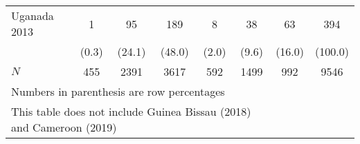 \begin{tabular}{l*{7}{c}}
Uganada 2013&                  {1}&               {95}&          {189}&                    {8}&       {38}&               {63}&               {394}\\
&                                              {(0.3)}&     {(24.1)}&        {(48.0)}&                  {(2.0)}&     {(9.6)}&     {(16.0)}&             {(100.0)}\\
\hline
\(N\)    &                             {455}&       {2391}&               {3617}&                {592}&        {1499}&    {992}&         {9546}\\
\hline\hline
\multicolumn{6}{l}{\footnotesize Numbers in parenthesis are row percentages}\\
\multicolumn{6}{l}{\footnotesize This table does not include Guinea Bissau (2018) and Cameroon (2019)}\\
\end{tabular}